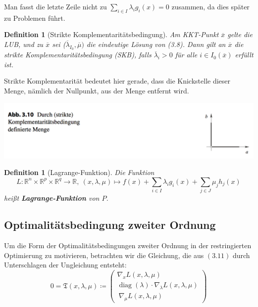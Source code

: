 \documentclass[11pt]{scrreprt}
\newcounter{thm}
\theoremstyle{thmstyle}
\numberwithin{thm}{section}
\newtheorem{definition}[thm]{Definition}
\begin{document}
Man fasst die letzte Zeile nicht zu $\sum_{i \in I} \lambda_i g_i(x) = 0$ zusammen, da dies später zu Problemen führt.

\begin{definition}[Strikte Komplementaritätsbedingung]
	Am KKT-Punkt $\overline{x}$ gelte die LUB, und zu $\overline{x}$ sei ($\overline{\lambda}_{I_0}, \overline{\mu})$ die eindeutige Lösung von (3.8). Dann gilt an $\overline{x}$ die strikte Komplementaritätsbedingung (SKB), falls $\overline{\lambda}_i > 0$ für alle $i \in I_0(\overline{x})$ erfüllt ist.
\end{definition}
 
Strikte Komplementarität bedeutet hier gerade, dass die Knickstelle dieser Menge, nämlich der Nullpunkt, aus der Menge entfernt wird.

\begin{center}
	\includegraphics[scale=0.5]{img/ab310}
\end{center}

\setcounter{thm}{51}
 
\begin{definition}[Lagrange-Funktion]
	Die Funktion
	$$ L \colon \mathbb{R}^n \times \mathbb{R}^p \times \mathbb{R}^q \rightarrow \mathbb{R}, ~ (x, \lambda, \mu) \mapsto f(x) + \sum_{i \in I} \lambda_i g_i(x) + \sum_{j \in J} \mu_j h_j(x) $$
	heißt \textbf{Lagrange-Funktion} von $P$.
\end{definition} 

\subsection*{Optimalitätsbedingung zweiter Ordnung}

Um die Form der Optimalitätsbedingungen zweiter Ordnung in der restringierten Optimierung zu motivieren, betrachten wir die Gleichung, die aus $(3.11)$ durch Unterschlagen der Ungleichung entsteht:
$$ 0 = \mathfrak{T}(x, \lambda, \mu) \coloneqq \begin{pmatrix}
	\nabla_x L(x, \lambda, \mu) \\ \operatorname{diag}(\lambda) \cdot \nabla_\lambda L(x, \lambda, \mu) \\\
	\nabla_\mu L(x, \lambda, \mu)
\end{pmatrix} $$
\end{document}
